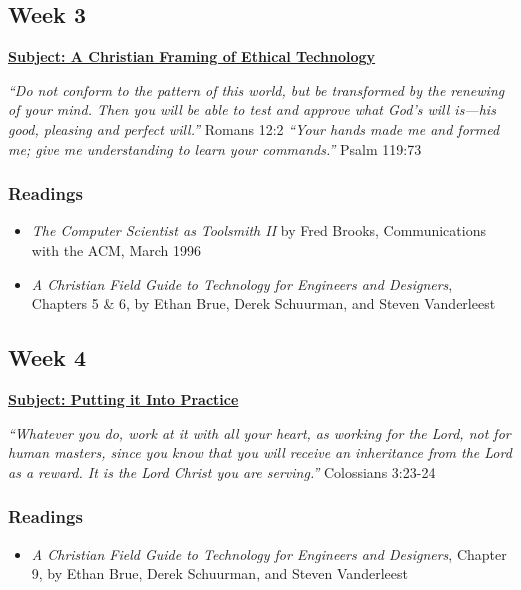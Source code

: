 \documentclass[11pt]{article}
\begin{document}
\subsection*{Week 3}
\label{sec:org8b7965a}
\textbf{\uline{Subject: A Christian Framing of Ethical Technology}}
\begin{mdframed}[nobreak=true]
\emph{``Do not conform to the pattern of this world, but be transformed by the
renewing of your mind. Then you will be able to test and approve what God’s will
is—his good, pleasing and perfect will.''} Romans 12:2 \newline
\noindent \emph{``Your hands made me and formed me; give me understanding to
learn your commands.''} Psalm 119:73
\end{mdframed}
\subsubsection*{Readings}
\label{sec:org7ba313d}
\begin{itemize}
\item \emph{The Computer Scientist as Toolsmith II} by Fred Brooks, Communications with
the ACM, March 1996
\item \emph{A Christian Field Guide to Technology for Engineers and Designers}, Chapters
5 \& 6, by Ethan Brue, Derek Schuurman, and Steven Vanderleest
\end{itemize}
\subsection*{Week 4}
\label{sec:org52d5c52}
\textbf{\uline{Subject: Putting it Into Practice}}
\begin{mdframed}[nobreak=true]
\emph{``Whatever you do, work at it with all your heart, as working for the Lord, not
for human masters, since you know that you will receive an inheritance from the
Lord as a reward. It is the Lord Christ you are serving.''} Colossians 3:23-24
\end{mdframed}
\subsubsection*{Readings}
\label{sec:org7f3ebb6}
\begin{itemize}
\item \emph{A Christian Field Guide to Technology for Engineers and Designers}, Chapter
9, by Ethan Brue, Derek Schuurman, and Steven Vanderleest
\end{itemize}
\end{document}

